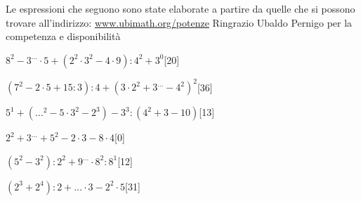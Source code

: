 
Le espressioni che seguono sono state elaborate a partire da quelle che si 
possono trovare all'indirizzo:
\href{http:// www.ubimath.org/potenze}{ www.ubimath.org/potenze}
Ringrazio Ubaldo Pernigo per la competenza e disponibilità

\begin{esercizio} %
\(8^2-3^{\dots}\cdot5+(2^2\cdot3^2-4\cdot9):4^2+3^0\)\hfill[20]
\end{esercizio}
\begin{esercizio} %
\((7^2-2\cdot5+15:3):4+(3\cdot2^2+3^{\dots}-4^2)^2\)\hfill[36]
\end{esercizio}
\begin{esercizio} %
\(5^1+({\dots}^2-5\cdot3^2-2^3)-3^3:(4^2+3-10)\)\hfill[13]
\end{esercizio}
\begin{esercizio} %
\(2^2+3^{\dots}+5^2-2\cdot3-8\cdot4\)\hfill[0]
\end{esercizio}
\begin{esercizio} %
\((5^2-3^2):2^2+9^{\dots}\cdot8^2:8^1\)\hfill[12]
\end{esercizio}
\begin{esercizio} %
\((2^3+2^4):2+{\dots}\cdot3-2^2\cdot5\)\hfill[31]
\end{esercizio}
